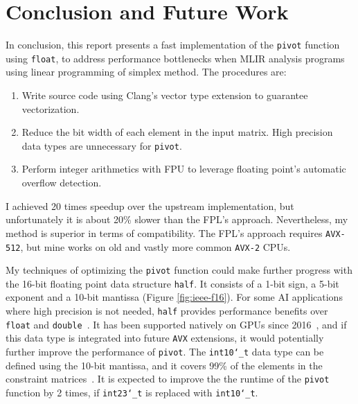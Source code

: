 \documentclass[logo,bsc,singlespacing,parskip]{infthesis}
\newcommand{\dthalfi}{\texttt{int10\char`_t}}
\newcommand{\dtshort}{\texttt{int16\char`_t}}
\newcommand{\dthalf}{\texttt{half}}
\newcommand{\dtfloat}{\texttt{float}}
\newcommand{\dtfloati}{\texttt{int23\char`_t}}
\newcommand{\dtdouble}{\texttt{double}}
\newcommand{\pivot}{\texttt{pivot}}
\newenvironment{compactlist}
{ \begin{enumerate}
    \setlength{\itemsep}{0pt}
    \setlength{\parskip}{0pt}
    \setlength{\parsep}{0pt}     
}
{ \end{enumerate} }
\begin{document}


\chapter{Conclusion and Future Work}

In conclusion, this report presents a fast implementation of the \pivot{}
function using \dtfloat{}, to address performance bottlenecks when MLIR analysis
programs using linear programming of simplex method. The procedures are: 
\vspace*{-2.2mm}
\begin{compactlist}
    \item Write source code using Clang's vector type extension to guarantee
    vectorization.
    \item Reduce the bit width of each element in the input matrix. High
    precision data types are unnecessary for \pivot{}.
    \item Perform integer arithmetics with FPU to leverage floating point's
    automatic overflow detection.
\end{compactlist}

I achieved 20 times speedup over the upstream implementation, but unfortunately
it is about 20\% slower than the FPL's approach. Nevertheless, my method is
superior in terms of compatibility. The FPL's approach requires
\texttt{AVX-512}, but mine works on old and vastly more common \texttt{AVX-2}
CPUs.


My techniques of optimizing the \texttt{pivot} function could make further
progress with the 16-bit floating point data structure \dthalf{}. It consists of
a 1-bit sign, a 5-bit exponent and a 10-bit mantissa (Figure
\ref{fig:ieee-f16}). For some AI applications where high precision is not
needed, \dthalf{} provides performance benefits over \dtfloat{} and
\dtdouble{}~\cite{fp16-fast}. It has been supported natively on GPUs since
2016~\cite{pascal-intro-fp16}, and if this data type is integrated into future
\texttt{AVX} extensions, it would potentially further improve the performance of
\pivot{}. The \dthalfi{} data type can be defined using the 10-bit mantissa, and
it covers 99\% of the elements in the constraint matrices~\cite{FPL1}. It is
expected to improve the the runtime of the \pivot{} function by 2 times, if
\dtfloati{} is replaced with \dthalfi{}.
\end{document}
